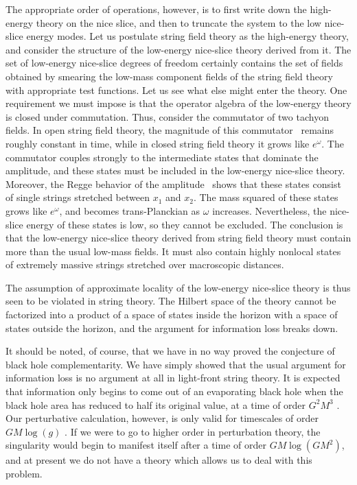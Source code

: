 The appropriate order of operations, however, is to first write down
the
high-energy theory on the nice slice, and then to truncate the system
to the low nice-slice energy modes.  Let us postulate string field
theory as the high-energy theory, and consider the structure of the
low-energy nice-slice theory derived from it.  The set of low-energy
nice-slice degrees of freedom certainly contains the set of fields
obtained by smearing the low-mass component fields of the string
field theory with appropriate test functions.  Let us see what else
might enter the theory.  One requirement we must impose is that the
operator algebra of the low-energy theory is closed under
commutation.  Thus, consider the commutator of two tachyon fields.
In open string field theory,
the magnitude of this commutator \goobfour\ remains roughly constant
in time,
while in closed string field theory it grows like $e^{\omega}$.
The commutator couples strongly to the intermediate states
that dominate the amplitude, and these states must be
included in the low-energy nice-slice theory.  Moreover, the Regge
behavior of the amplitude \goobfour\ shows that these states consist
of
single strings stretched between $x_1$ and $x_2$.  The mass squared
of these states grows like $e^{\omega}$, and becomes trans-Planckian
as $\omega$ increases.  Nevertheless, the nice-slice energy of these
states is low, so they cannot be excluded.  The conclusion is that
the
low-energy nice-slice theory derived from string field theory must
contain more than the usual low-mass fields.  It must also contain
highly nonlocal states of extremely massive strings stretched over
macroscopic distances.

The assumption of approximate locality of the low-energy nice-slice
theory is thus seen to be violated in string theory.  The Hilbert
space of the
theory cannot be factorized into a product of a space of states
inside the horizon with a space of states outside the horizon, and
the argument for information loss breaks down.

It should be noted, of course, that we have in no way proved the
conjecture of black hole complementarity.  We have simply showed that
the usual argument for information loss is no argument at all in
light-front string theory. It is expected that information only
begins to
come out of an evaporating black hole when the black hole area has
reduced to half
its original value, at a time of order $G^2 M^3$ .  Our
perturbative calculation, however, is only valid for timescales of
order $GM \log (g)$ .  If we were to go to higher
order in perturbation theory, the singularity would begin to
manifest itself after a time of order $GM \log (GM^2)$, and at
present we do not have a theory which allows us to deal with this
problem.

